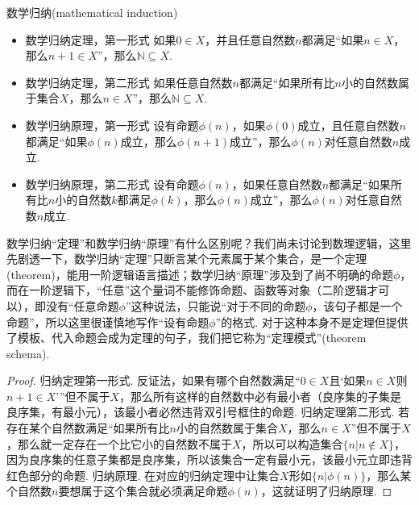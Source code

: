 \documentclass[main.tex]{subfiles}
\begin{document}
\begin{theorem}{数学归纳(mathematical induction)}
    \begin{itemize}
        \item 数学归纳定理，第一形式 \newline
        如果\(0 \in X\)，并且任意自然数\(n\)都满足“如果\(n \in X\)，那么\(n+1 \in X\)”，那么\(\mathbb{N} \subseteq X\).
        \item 数学归纳定理，第二形式 \newline
        如果任意自然数\(n\)都满足“如果所有比\(n\)小的自然数属于集合\(X\)，那么\(n \in X\)”，那么\(\mathbb{N} \subseteq X\).
        \item 数学归纳原理，第一形式 \newline
        设有命题\(\phi(n)\)，如果\(\phi(0)\)成立，且任意自然数\(n\)都满足“如果\(\phi(n)\)成立，那么\(\phi(n+1)\)成立”，那么\(\phi(n)\)对任意自然数\(n\)成立.
        \item 数学归纳原理，第二形式 \newline
        设有命题\(\phi(n)\)，如果任意自然数\(n\)都满足“如果所有比\(n\)小的自然数\(k\)都满足\(\phi(k)\)，那么\(\phi(n)\)成立”，那么\(\phi(n)\)对任意自然数\(n\)成立.
    \end{itemize}
\end{theorem}

数学归纳“定理”和数学归纳“原理”有什么区别呢？我们尚未讨论到数理逻辑，这里先剧透一下，数学归纳“定理”只断言某个元素属于某个集合，是一个定理(theorem)，能用一阶逻辑语言描述；数学归纳“原理”涉及到了尚不明确的命题\(\phi\)，而在一阶逻辑下，“任意”这个量词不能修饰命题、函数等对象（二阶逻辑才可以），即没有“任意命题\(\phi\)”这种说法，只能说“对于不同的命题\(\phi\)，该句子都是一个命题”，所以这里很谨慎地写作“设有命题\(\phi\)”的格式. 对于这种本身不是定理但提供了模板、代入命题会成为定理的句子，我们把它称为“定理模式”(theorem schema).

\begin{proof}
    归纳定理第一形式. 反证法，如果有哪个自然数满足“\(0 \in X\)且‘如果\(n \in X\)则\(n+1 \in X\)’”但不属于\(X\)，那么所有这样的自然数中必有最小者（良序集的子集是良序集，有最小元），该最小者必然违背双引号框住的命题. \newline
    归纳定理第二形式. 若存在某个自然数满足“如果所有比\(n\)小的自然数属于集合\(X\)，那么\(n \in X\)”但不属于\(X\)，那么就一定存在一个比它小的自然数不属于\(X\)，所以可以构造集合\(\{n | n \not \in X\}\)，因为良序集的任意子集都是良序集，所以该集合一定有最小元，该最小元立即违背红色部分的命题. \newline
    归纳原理. 在对应的归纳定理中让集合\(X\)形如\(\{n|\phi(n)\}\)，那么某个自然数\(n\)要想属于这个集合就必须满足命题\(\phi(n)\)，这就证明了归纳原理.
\end{proof}
\end{document}
